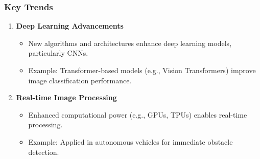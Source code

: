 \documentclass[aspectratio=169]{beamer}
\begin{document}
\begin{frame}[fragile]
    \frametitle{Key Trends}
    \begin{enumerate}
        \item \textbf{Deep Learning Advancements}
            \begin{itemize}
                \item New algorithms and architectures enhance deep learning models, particularly CNNs.
                \item Example: Transformer-based models (e.g., Vision Transformers) improve image classification performance.
            \end{itemize}

        \item \textbf{Real-time Image Processing}
            \begin{itemize}
                \item Enhanced computational power (e.g., GPUs, TPUs) enables real-time processing.
                \item Example: Applied in autonomous vehicles for immediate obstacle detection.
            \end{itemize}
    \end{enumerate}
\end{frame}
\end{document}
